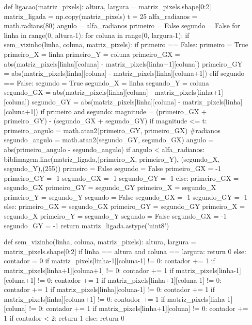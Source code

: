 \documentclass[a4paper,12pt]{article}
\begin{document}
\begin{python}
def ligacao(matriz_pixels):
  altura, largura = matriz_pixels.shape[0:2]
  matriz_ligada = np.copy(matriz_pixels)
  t = 25
  alfa_radianos = math.radians(80)
  angulo = alfa_radianos
  primeiro = False
  segundo = False
  for linha in range(0, altura-1):
    for coluna in range(0, largura-1):
      if sem_vizinho(linha, coluna, matriz_pixels):
        if primeiro == False:
          primeiro = True
          primeiro_X = linha
          primeiro_Y = coluna
          primeiro_GX = abs(matriz_pixels[linha][coluna]
           - matriz_pixels[linha+1][coluna])
          primeiro_GY = abs(matriz_pixels[linha][coluna]
           - matriz_pixels[linha][coluna+1])
        elif segundo == False:
          segundo = True
          segundo_X = linha
          segundo_Y = coluna
          segundo_GX = abs(matriz_pixels[linha][coluna]
           - matriz_pixels[linha+1][coluna])
          segundo_GY = abs(matriz_pixels[linha][coluna]
           - matriz_pixels[linha][coluna+1])
        if primeiro and segundo:
          magnitude = (primeiro_GX + primeiro_GY) - (segundo_GX + segundo_GY)
          if magnitude <= t:
            primeiro_angulo =  math.atan2(primeiro_GY, primeiro_GX) #radianos
            segundo_angulo =  math.atan2(segundo_GY, segundo_GX)
            angulo = abs(primeiro_angulo - segundo_angulo)
            if angulo < alfa_radianos:
              biblimagem.line(matriz_ligada,(primeiro_X, primeiro_Y),
               (segundo_X, segundo_Y),(255))
              primeiro = False
              segundo = False
              primeiro_GX = -1
              primeiro_GY = -1
              segundo_GX = -1
              segundo_GY = -1
            else:
              primeiro_GX = segundo_GX
              primeiro_GY = segundo_GY
              primeiro_X = segundo_X
              primeiro_Y = segundo_Y
              segundo = False
              segundo_GX = -1
              segundo_GY = -1
          else:
            primeiro_GX = segundo_GX
            primeiro_GY = segundo_GY
            primeiro_X = segundo_X
            primeiro_Y = segundo_Y
            segundo = False
            segundo_GX = -1
            segundo_GY = -1
  return matriz_ligada.astype('uint8')

def sem_vizinho(linha, coluna, matriz_pixels):
   altura, largura = matriz_pixels.shape[0:2]
   if linha == altura and coluna == largura:
       return 0
   else:
       contador = 0
       if matriz_pixels[linha-1][coluna-1] != 0:
           contador += 1
       if matriz_pixels[linha+1][coluna+1] != 0:
           contador += 1
       if matriz_pixels[linha-1][coluna+1] != 0:
           contador += 1
       if matriz_pixels[linha+1][coluna-1] != 0:
           contador += 1
       if matriz_pixels[linha][coluna-1] != 0:
           contador += 1
       if matriz_pixels[linha][coluna+1] != 0:
           contador += 1
       if matriz_pixels[linha-1][coluna] != 0:
           contador += 1
       if matriz_pixels[linha+1][coluna] != 0:
           contador += 1
       if contador < 2:
           return 1
       else:
           return 0
\end{python}
\end{document}
